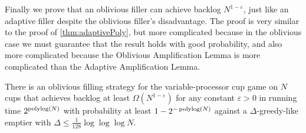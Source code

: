Finally we prove that an oblivious filler can achieve backlog
$N^{1-\varepsilon}$, just like an adaptive filler despite the
oblivious filler's disadvantage. The proof is very similar to the
proof of \cref{thm:adaptivePoly}, but more complicated because in
the oblivious case we must guarantee that the result holds with
good probability, and also more complicated because the Oblivious
Amplification Lemma is more complicated than the Adaptive
Amplification Lemma. 
\begin{theorem}
  \label{thm:obliviousPoly}
  There is an oblivious filling strategy for the
  variable-processor cup game on $N$ cups that achieves backlog
  at least $\Omega(N^{1-\varepsilon})$ for any constant $\varepsilon
  >0$ in running time $2^{\operatorname{\text{polylog}}(N)}$ with probability at least
  $1-2^{-\operatorname{\text{polylog}}(N)}$ against a $\Delta$-greedy-like emptier
  with $\Delta \le \frac{1}{128} \log\log\log N$.
\end{theorem}
